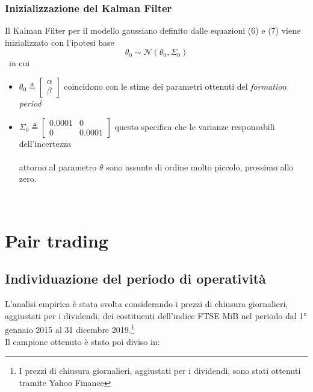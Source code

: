 \documentclass[]{article}
\begin{document}
\subsubsection{Inizializzazione del Kalman Filter}
Il Kalman Filter per il modello gaussiano definito dalle equazioni (6) e (7)
viene inizializzato con l'ipotesi base
\begin{equation}
	\theta_0 \sim \mathcal{N}(\theta_0,\Sigma_0)
\end{equation}
\
in cui
\begin{itemize}
	\item $\theta_0 \triangleq \begin{bmatrix}
		\alpha\\
		\beta
	\end{bmatrix}$ coincidono con le stime dei parametri ottenuti del \textit{formation period}
	\item $\Sigma_0 \triangleq \begin{bmatrix}
		0.0001 & 0 \\
		0 & 0.0001
	\end{bmatrix}$ questo specifica che le varianze responsabili dell'incertezza \\\\
 attorno al parametro $\theta$ sono assunte di ordine molto piccolo, prossimo allo zero.
\end{itemize}
\



\break

\section{Pair trading}

\subsection{Individuazione del periodo di operatività}

L'analisi empirica è stata svolta considerando i prezzi di chiusura giornalieri, aggiustati per i dividendi, dei costituenti dell'indice FTSE MiB nel periodo dal 1° gennaio 2015 al 31 dicembre 2019.\footnote{I prezzi di chiusura giornalieri, aggiustati per i dividendi, sono stati ottenuti tramite Yahoo Finance}
\\
Il campione ottenuto è stato poi diviso in:
\end{document}
